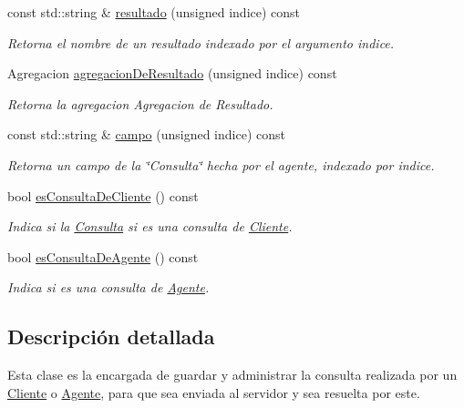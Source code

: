 \begin{DoxyCompactItemize}
const std\-::string \& \hyperlink{classConsulta_acc0fd21c01a4de089670cd5385be4206}{resultado} (unsigned indice) const 
\begin{DoxyCompactList}\small\item\em \-Retorna el nombre de un resultado indexado por el argumento indice. \end{DoxyCompactList}\item 
\-Agregacion \hyperlink{classConsulta_a51e8e30d03493fd5c818b4ad6bd5fdf3}{agregacion\-De\-Resultado} (unsigned indice) const 
\begin{DoxyCompactList}\small\item\em \-Retorna la agregacion \-Agregacion de \-Resultado. \end{DoxyCompactList}\item 
const std\-::string \& \hyperlink{classConsulta_a2002e971cfc49f7fdec5f7a9d1de3bf8}{campo} (unsigned indice) const 
\begin{DoxyCompactList}\small\item\em \-Retorna un campo de la \char`\"{}\-Consulta\char`\"{} hecha por el agente, indexado por indice. \end{DoxyCompactList}\item 
bool \hyperlink{classConsulta_a721508f359b9391d9b9a906067d9a368}{es\-Consulta\-De\-Cliente} () const 
\begin{DoxyCompactList}\small\item\em \-Indica si la \hyperlink{classConsulta}{\-Consulta} si es una consulta de \hyperlink{classCliente}{\-Cliente}. \end{DoxyCompactList}\item 
bool \hyperlink{classConsulta_a6e39b6d94eba4c3ff0079a7ce64f0008}{es\-Consulta\-De\-Agente} () const 
\begin{DoxyCompactList}\small\item\em \-Indica si es una consulta de \hyperlink{classAgente}{\-Agente}. \end{DoxyCompactList}\end{DoxyCompactItemize}


\subsection{\-Descripción detallada}
\-Esta clase es la encargada de guardar y administrar la consulta realizada por un \hyperlink{classCliente}{\-Cliente} o \hyperlink{classAgente}{\-Agente}, para que sea enviada al servidor y sea resuelta por este. 

